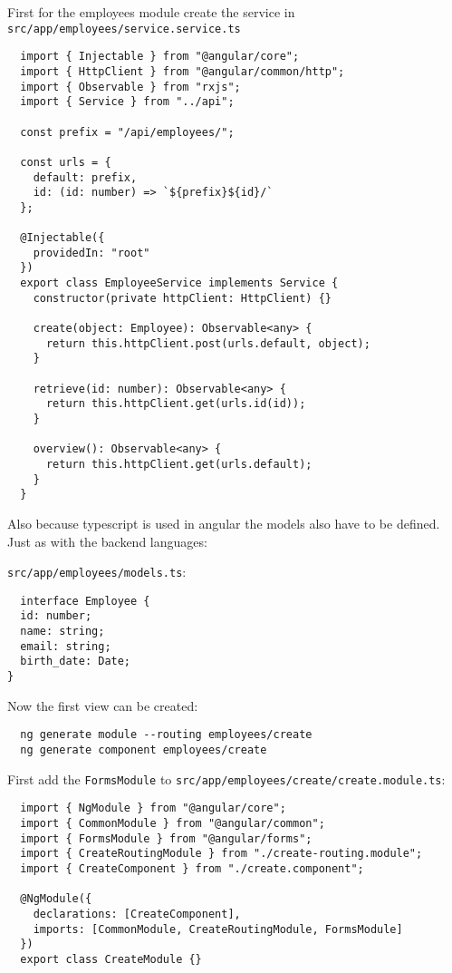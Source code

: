 First for the employees module create the service in \texttt{src/app/employees/service.service.ts}

\begin{verbatim}
  import { Injectable } from "@angular/core";
  import { HttpClient } from "@angular/common/http";
  import { Observable } from "rxjs";
  import { Service } from "../api";

  const prefix = "/api/employees/";

  const urls = {
    default: prefix,
    id: (id: number) => `${prefix}${id}/`
  };

  @Injectable({
    providedIn: "root"
  })
  export class EmployeeService implements Service {
    constructor(private httpClient: HttpClient) {}

    create(object: Employee): Observable<any> {
      return this.httpClient.post(urls.default, object);
    }

    retrieve(id: number): Observable<any> {
      return this.httpClient.get(urls.id(id));
    }

    overview(): Observable<any> {
      return this.httpClient.get(urls.default);
    }
  }
\end{verbatim}

Also because typescript is used in angular the models also have to be defined. Just as with the backend languages:

\texttt{src/app/employees/models.ts}:
\begin{verbatim}
  interface Employee {
  id: number;
  name: string;
  email: string;
  birth_date: Date;
}
\end{verbatim}

Now the first view can be created:
\begin{verbatim}
  ng generate module --routing employees/create
  ng generate component employees/create
\end{verbatim}

First add the \texttt{FormsModule} to \texttt{src/app/employees/create/create.module.ts}:
\begin{verbatim}
  import { NgModule } from "@angular/core";
  import { CommonModule } from "@angular/common";
  import { FormsModule } from "@angular/forms";
  import { CreateRoutingModule } from "./create-routing.module";
  import { CreateComponent } from "./create.component";

  @NgModule({
    declarations: [CreateComponent],
    imports: [CommonModule, CreateRoutingModule, FormsModule]
  })
  export class CreateModule {}
\end{verbatim}

